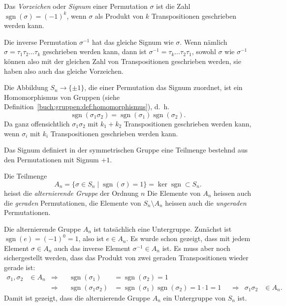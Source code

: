 \begin{definition}
%
%
Das {\em Vorzeichen} oder {\em Signum} einer Permutation $\sigma$ ist
die Zahl $\operatorname{sgn}(\sigma)=(-1)^k$, wenn $\sigma$ als Produkt
von $k$ Transpositionen geschrieben werden kann.
\end{definition}

Die inverse Permutation $\sigma^{-1}$ hat das gleiche Signum wie $\sigma$.
Wenn nämlich $\sigma= \tau_1\tau_2\dots\tau_k$ geschrieben werden kann,
dann ist $\sigma^{-1}=\tau_k\dots\tau_2\tau_1$, sowohl $\sigma$ wie
$\sigma^{-1}$ können also mit der gleichen Zahl von Transpositionen
geschrieben werden, sie haben also auch das gleiche Vorzeichen.

Die Abbildung $S_n\to\{\pm1\}$, die einer Permutation das Signum zuordnet,
ist ein Homomorphismus von Gruppen
(siehe Definition~\ref{buch:gruppen:def:homomorphismus}),
%
d.~h.
\[
\operatorname{sgn}(\sigma_1\sigma_2)
=
\operatorname{sgn}(\sigma_1)
\operatorname{sgn}(\sigma_2).
\]
Da ganz offensichtlich $\sigma_1\sigma_2$ mit $k_1+k_2$ Transpositionen
geschrieben werden kann, wenn $\sigma_i$ mit $k_i$ Transpositionen geschrieben
werden kann.

Das Signum definiert in der symmetrischen Gruppe eine Teilmenge bestehnd
aus den Permutationen mit Signum $+1$.

\begin{definition}
Die Teilmenge
\[
A_n
=
\{
\sigma\in S_n\;|\; \operatorname{sgn}(\sigma)=1
\}
=
\ker \operatorname{sgn}
\subset
S_n.
\]
%
%
heisst die {\em alternierende Gruppe} der Ordnung $n$
Die Elemente von $A_n$ heissen auch die {\em geraden} Permutationen,
%
%
die
Elemente von $S_n\setminus A_n$ heissen auch die {\em ungeraden}
Permutationen.
\end{definition}

Die alternierende Gruppe $A_n$ ist tatsächlich eine Untergruppe.
%
Zunächst ist $\operatorname{sgn}(e)=(-1)^0=1$, also ist $e\in A_n$.
Es wurde schon gezeigt, dass mit jedem Element $\sigma\in A_n$ auch
das inverse Element $\sigma^{-1}\in A_n$ ist.
Es muss aber noch sichergestellt werden, dass das Produkt von zwei
geraden Transpositionen wieder gerade ist:
\[
\begin{aligned}
\sigma_1,\sigma_2&\in A_n
&\Rightarrow&&
\operatorname{sgn}(\sigma_1)
&=
\operatorname{sgn}(\sigma_2)
=
1
\\
&&\Rightarrow&&
\operatorname{sgn}(\sigma_1\sigma_2)
&=
\operatorname{sgn}(\sigma_1)
\operatorname{sgn}(\sigma_2)
=
1\cdot 1=1
&&\Rightarrow&
\sigma_1\sigma_2&\in A_n.
\end{aligned}
\]
Damit ist gezeigt, dass die alternierende Gruppe $A_n$ ein Untergruppe von 
$S_n$ ist.

